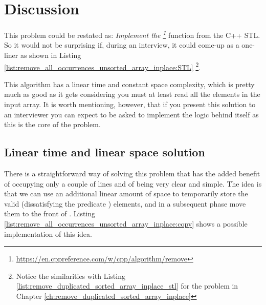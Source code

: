 \section{Discussion}
\label{remove_all_occurrences_unsorted_array_inplace:sec:discussion}
This problem could be restated as: \textit{Implement the
\footnote{\url{https://en.cppreference.com/w/cpp/algorithm/remove}}} function from
the C++ STL. So it would not be surprising if, during an interview,  it could come-up as a
one-liner as  shown in Listing \ref{list:remove_all_occurrences_unsorted_array_inplace:STL}
\footnote{Notice the similarities with Listing \ref{list:remove_duplicated_sorted_array_inplace_stl} for the problem in Chapter \ref{ch:remove_duplicated_sorted_array_inplace}}.




This algorithm has a linear time and constant space complexity, which is pretty much as good as it gets considering you must at least read all the elements in the input array. 
It is worth mentioning, however, that  if you present this solution to an interviewer you can expect to be asked to implement the logic behind 
 itself as this is the core of the problem. 

\subsection{Linear time and linear space solution}
\label{remove_all_occurrences_unsorted_array_inplace:sec:bruteforce}
There is a straightforward way of solving this problem that has the added benefit of occupying
only a couple of lines and of being very clear and simple. The idea is that we can use an additional
linear amount of space to temporarily store the valid (dissatisfying the predicate 
) elements, and in a subsequent
phase move them to the front of 
. Listing \ref{list:remove_all_occurrences_unsorted_array_inplace:copy} shows a possible implementation of this idea.




